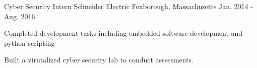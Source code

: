 \begin{cventries}
  \cventry
    {Cyber Security Intern} %
    {Schneider Electric} %
    {Foxborough, Massachusetts} %
    {Jan. 2014 - Aug. 2016} %
    {
      \begin{cvitems} %
        \item {
            Completed development tasks including embedded software development and python scripting
        }
        \item {
            Built a virutalized cyber security lab to conduct assessments.
        }
      \end{cvitems}
    }

\end{cventries}

